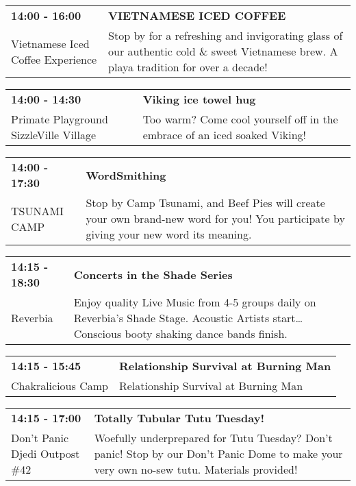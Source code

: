 \begin{tabular}{ p{1in} p{2.2in} }
    \textbf{14:00 - 16:00} & \textbf{VIETNAMESE ICED COFFEE} \\
    Vietnamese Iced Coffee Experience \newline  & Stop by for a refreshing and invigorating glass of our authentic cold \& sweet Vietnamese brew. A playa tradition for over a decade! \\
    \hline 
\end{tabular}
    
\begin{tabular}{ p{1in} p{2.2in} }
    \textbf{14:00 - 14:30} & \textbf{Viking ice towel hug} \\
    Primate Playground \newline SizzleVille Village & Too warm? Come cool yourself off in the embrace of an iced soaked Viking! \\
    \hline 
\end{tabular}
    
\begin{tabular}{ p{1in} p{2.2in} }
    \textbf{14:00 - 17:30} & \textbf{WordSmithing} \\
    TSUNAMI CAMP \newline  & Stop by Camp Tsunami, and Beef Pies will create your own brand-new word for you! You participate by giving your new word its meaning. \\
    \hline 
\end{tabular}
    
\begin{tabular}{ p{1in} p{2.2in} }
    \textbf{14:15 - 18:30} & \textbf{Concerts in the Shade Series} \\
    Reverbia \newline  & Enjoy quality Live Music from 4-5 groups daily on Reverbia's Shade Stage.  Acoustic Artists start\ldots Conscious booty shaking dance bands finish. \\
    \hline 
\end{tabular}
    
\begin{tabular}{ p{1in} p{2.2in} }
    \textbf{14:15 - 15:45} & \textbf{Relationship Survival at Burning Man} \\
    Chakralicious Camp \newline  & Relationship Survival at Burning Man \\
    \hline 
\end{tabular}
    
\begin{tabular}{ p{1in} p{2.2in} }
    \textbf{14:15 - 17:00} & \textbf{Totally Tubular Tutu Tuesday!} \\
    Don't Panic Djedi Outpost \#42 \newline  & Woefully underprepared for Tutu Tuesday? Don't panic! Stop by our Don't Panic Dome to make your very own no-sew tutu. Materials provided! \\
    \hline 
\end{tabular}
    
